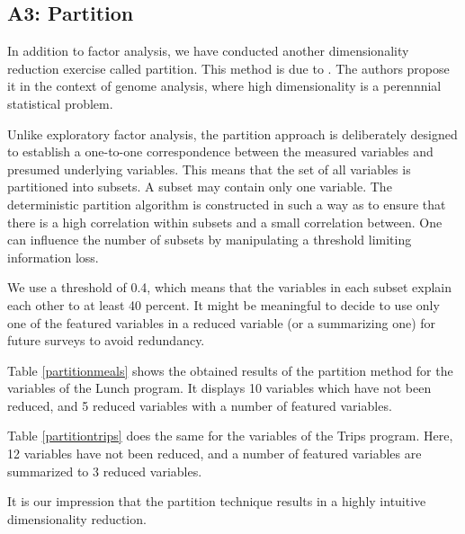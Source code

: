 \documentclass[12pt, a4paper, titlepage]{article}\usepackage[]{graphicx}\usepackage[]{color}
\begin{document}
\subsection{A3: Partition}

In addition to factor analysis, we have conducted another dimensionality reduction exercise called partition. This method is due to \textcite{Millstein.2020}. The authors propose it in the context of genome analysis, where high dimensionality is a perennnial statistical problem. 

Unlike exploratory factor analysis, the partition approach is deliberately designed to establish a one-to-one correspondence between the measured variables and presumed underlying variables. This means that the set of all variables is partitioned into subsets. A subset may contain only one variable. The deterministic partition algorithm is constructed in such a way as to ensure that there is a high correlation within subsets and a small correlation between. One can influence the number of subsets by manipulating a threshold limiting information loss. 

We use a threshold of 0.4, which means that the variables in each subset explain each other to at least 40 percent. It might be meaningful to decide to use only one of the featured variables in a reduced variable (or a summarizing one) for future surveys to avoid redundancy.

Table \ref{partitionmeals} shows the obtained results of the partition method for the variables of the Lunch program. It displays 10 variables which have not been reduced, and 5 reduced variables with a number of featured variables.

Table \ref{partitiontrips} does the same for the variables of the Trips program. Here, 12 variables have not been reduced, and a number of featured variables are summarized to 3 reduced variables. 

It is our impression that the partition technique results in a highly intuitive dimensionality reduction.
\end{document}
